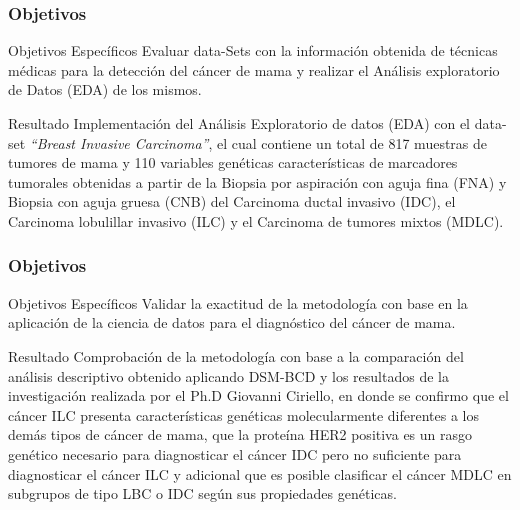 \documentclass[xcolor=dvipsnames,xcolor=table]{beamer} %
\begin{document}
\begin{frame}
	\frametitle{Objetivos}
	\begin{block}{Objetivos Específicos}\justifying
		Evaluar data-Sets con la información obtenida de técnicas médicas para la detección del cáncer de mama y realizar el Análisis exploratorio de Datos (EDA) de los mismos.		
	\end{block}
	
	\begin{alertblock}{Resultado}
	\justifying	
	Implementación del Análisis Exploratorio de datos (EDA) con el data-set \textit{“Breast Invasive Carcinoma”}, el cual contiene un total de 817 muestras de tumores de mama y 110 variables genéticas características de marcadores tumorales obtenidas a partir de la Biopsia por aspiración con aguja fina (FNA) y Biopsia con aguja gruesa (CNB) del Carcinoma ductal invasivo (IDC), el Carcinoma lobulillar invasivo (ILC) y el Carcinoma de tumores mixtos (MDLC).
	\end{alertblock}

\end{frame}

\begin{frame}
	\frametitle{Objetivos}
	\begin{block}{Objetivos Específicos}\justifying
		Validar la exactitud de la metodología con base en la aplicación de la ciencia de datos para el diagnóstico del cáncer de mama.	
	\end{block}
	
	\begin{alertblock}{Resultado}
		\justifying	
		Comprobación de la metodología con base a la comparación del análisis descriptivo obtenido aplicando DSM-BCD  y los resultados de la investigación realizada por el Ph.D Giovanni Ciriello, en donde se confirmo que el cáncer ILC presenta características genéticas molecularmente diferentes a los demás tipos de cáncer de mama, que  la proteína HER2 positiva es un rasgo genético necesario para diagnosticar el cáncer IDC pero no suficiente para diagnosticar el cáncer ILC y adicional que es posible clasificar el cáncer MDLC en subgrupos de tipo LBC o IDC según sus propiedades genéticas.
	\end{alertblock}
\end{frame}
\end{document}
